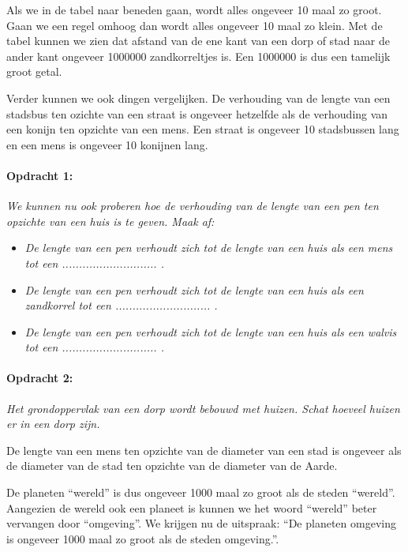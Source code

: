 Als we in de tabel naar beneden gaan, wordt alles ongeveer 10 maal
zo groot. Gaan we een regel omhoog dan wordt alles ongeveer 10 maal
zo klein. Met de tabel kunnen we zien dat afstand van de ene kant
van een dorp of stad naar de ander kant ongeveer 1000000 zandkorreltjes
is. Een 1000000 is dus een tamelijk groot getal.

Verder kunnen we ook dingen vergelijken. De verhouding van de lengte
van een stadsbus ten ozichte van een straat is ongeveer hetzelfde
als de verhouding van een konijn ten opzichte van een mens. Een straat
is ongeveer 10 stadsbussen lang en een mens is ongeveer 10 konijnen
lang.


\paragraph*{Opdracht 1:}

\emph{We kunnen nu ook proberen hoe de verhouding van de lengte van
een pen ten opzichte van een huis is te geven. Maak af:}
\begin{itemize}
\item \emph{De lengte van een pen verhoudt zich tot de lengte van een huis
als een mens tot een ............................ .}
\item \emph{De lengte van een pen verhoudt zich tot de lengte van een huis
als een zandkorrel tot een ............................ .}
\item \emph{De lengte van een pen verhoudt zich tot de lengte van een huis
als een walvis tot een ............................ .}
\end{itemize}

\paragraph*{Opdracht 2:}

\emph{Het grondoppervlak van een dorp wordt bebouwd met huizen. Schat
hoeveel huizen er in een dorp zijn.}

De lengte van een mens ten opzichte van de diameter van een stad is
ongeveer als de diameter van de stad ten opzichte van de diameter
van de Aarde.

De planeten ``wereld'' is dus ongeveer 1000 maal zo groot als de
steden ``wereld''. Aangezien de wereld ook een planeet is kunnen
we het woord ``wereld'' beter vervangen door ``omgeving''. We
krijgen nu de uitspraak: ``De planeten omgeving is ongeveer 1000
maal zo groot als de steden omgeving.''.

